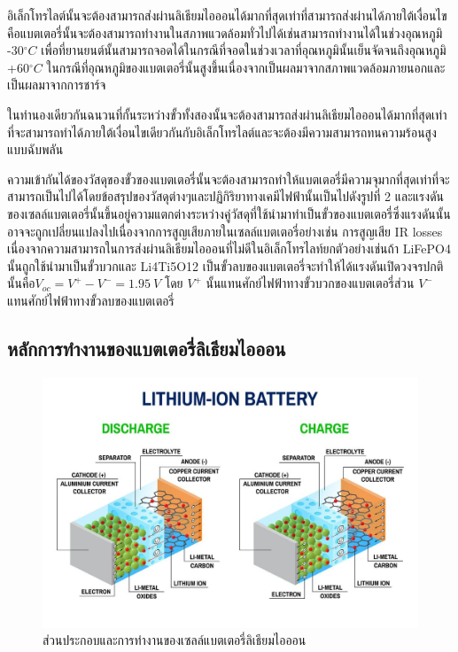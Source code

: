 \begin{itemize}
 {\item 
 	อิเล็กโทรไลต์นั้นจะต้องสามารถส่งผ่านลิเธียมไอออนได้มากที่สุดเท่าที่สามารถส่งผ่านได้ภายใต้เงื่อนไขคือแบตเตอรี่นั้นจะต้องสามารถทำงานในสภาพแวดล้อมทั่วไปได้เช่นสามารถทำงานได้ในช่วงอุณหภูมิ -30$^\circ C$ 	 	     เพื่อที่ยานยนต์นั้นสามารถจอดได้ในกรณีที่จอดในช่วงเวลาที่อุณหภูมินั้นเย็นจัดจนถึงอุณหภูมิ +60$^\circ C$ ในกรณีที่อุณหภูมิของแบตเตอรี่นั้นสูงขึ้นเนื่องจากเป็นผลมาจากสภาพแวดล้อมภายนอกและเป็นผลมาจากการชาร์จ}
 {\item 
 	ในทำนองเดียวกันฉนวนที่กั้นระหว่างขั้วทั้งสองนั้นจะต้องสามารถส่งผ่านลิเธียมไอออนได้มากที่สุดเท่าที่จะสามารถทำได้ภายใต้เงื่อนไขเดียวกันกับอิเล็กโทรไลต์และจะต้องมีความสามารถทนความร้อนสูงแบบฉับพลัน
 }
 {\item 
 	ความเข้ากันได้ของวัสดุของขั้วของแบตเตอรี่นั้นจะต้องสามารถทำให้แบตเตอรี่มีความจุมากที่สุดเท่าที่จะสามารถเป็นไปได้โดยข้อสรุปของวัสดุต่างๆและปฏิกิริยาทางเคมีไฟฟ้านั้นเป็นไปดังรูปที่ 2 	       และแรงดันของเซลล์แบตเตอรี่นั้นขึ้นอยู่ความแตกต่างระหว่างคู่วัสดุที่ใช้นำมาทำเป็นขั้วของแบตเตอรี่ซึ่งแรงดันนั้นอาจจะถูกเปลี่ยนแปลงไปเนื่องจากการสูญเสียภายในเซลล์แบตเตอรี่อย่างเช่น การสูญเสีย IR losses เนื่องจากความสามารถในการส่งผ่านลิเธียมไอออนที่ไม่ดีในอิเล็กโทรไลท์ยกตัวอย่างเช่นถ้า LiFePO4 นั้นถูกใช้นำมาเป็นขั้วบวกและ Li4Ti5O12 เป็นขั้วลบของแบตเตอรี่จะทำให้ได้แรงดันเปิดวงจรปกตินั้นคือ$V_{oc}=V^+-V^-=1.95\ V$ โดย $V^+$ นั้นแทนศักย์ไฟฟ้าทางขั้วบวกของแบตเตอรี่ส่วน $V^-$ แทนศักย์ไฟฟ้าทางขั้วลบของแบตเตอรี่
 }
\end{itemize}


\subsection{หลักการทำงานของแบตเตอรี่ลิเธียมไอออน}
\begin{center}
	\begin{figure}[!h]
		\includegraphics[width=0.6\linewidth]{Chapters/img/battery_structure.png}
			\centering
			\captionsetup{justification=centering,margin=2cm}
			\caption{ส่วนประกอบและการทำงานของเซลล์แบตเตอรี่ลิเธียมไอออน}
	\end{figure}
\end{center}

